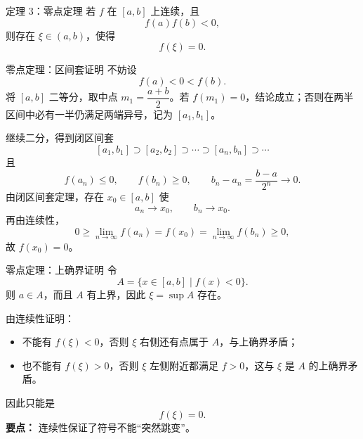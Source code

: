 ﻿\documentclass[aspectratio=169,11pt]{ctexbeamer}
\begin{document}
\begin{frame}[allowframebreaks]{定理 3：零点定理}
若 $f$ 在 $[a,b]$ 上连续，且
\[
  f(a)f(b)<0,
\]
则存在 $\xi\in(a,b)$，使得
\[
  f(\xi)=0.
\]
\begin{center}
\end{center}
\end{frame}

\begin{frame}[allowframebreaks]{零点定理：区间套证明}
不妨设
\[
  f(a)<0<f(b).
\]
将 $[a,b]$ 二等分，取中点 $m_1=\dfrac{a+b}{2}$。若 $f(m_1)=0$，结论成立；否则在两半区间中必有一半仍满足两端异号，记为 $[a_1,b_1]$。

继续二分，得到闭区间套
\[
  [a_1,b_1]\supset[a_2,b_2]\supset\cdots\supset[a_n,b_n]\supset\cdots
\]
且
\[
  f(a_n)\le 0,\qquad f(b_n)\ge 0,\qquad b_n-a_n=\frac{b-a}{2^n}\to 0.
\]
由闭区间套定理，存在 $x_0\in[a,b]$ 使
\[
  a_n\to x_0,\qquad b_n\to x_0.
\]
再由连续性，
\[
  0\ge \lim_{n\to\infty}f(a_n)=f(x_0)=\lim_{n\to\infty}f(b_n)\ge 0,
\]
故 $f(x_0)=0$。
\end{frame}

\begin{frame}{零点定理：上确界证明}
令
\[
  A=\{x\in[a,b]\mid f(x)<0\}.
\]
则 $a\in A$，而且 $A$ 有上界，因此 $\xi=\sup A$ 存在。
\vspace{0.5em}

由连续性证明：
\begin{itemize}
  \item 不能有 $f(\xi)<0$，否则 $\xi$ 右侧还有点属于 $A$，与上确界矛盾；
  \item 也不能有 $f(\xi)>0$，否则 $\xi$ 左侧附近都满足 $f>0$，这与 $\xi$ 是 $A$ 的上确界矛盾。
\end{itemize}
因此只能是
\[
  f(\xi)=0.
\]
\vspace{0.5em}
\textbf{要点：} 连续性保证了符号不能“突然跳变”。
\end{frame}
\end{document}
